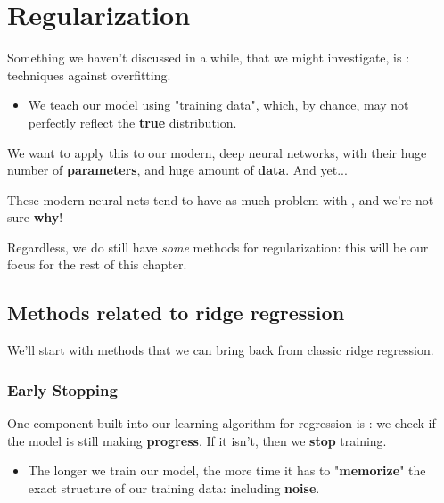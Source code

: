     \pagebreak
    
    
        
            




\pagebreak

\section{Regularization}

    Something we haven't discussed in a while, that we might investigate, is : techniques against overfitting.

    \begin{itemize}
        \item We teach our model using "training data", which, by chance, may not perfectly reflect the \textbf{true} distribution.
    \end{itemize}

    We want to apply this to our modern, deep neural networks, with their huge number of \textbf{parameters}, and huge amount of \textbf{data}. And yet...
    
    These modern neural nets  tend to have as much problem with , and we're not sure \textbf{why}!

    Regardless, we do still have \textit{some} methods for regularization: this will be our focus for the rest of this chapter.

    \subsection{Methods related to ridge regression}

        We'll start with methods that we can bring back from classic ridge regression.

        \subsubsection{Early Stopping}

            One component built into our learning algorithm for regression is : we check if the model is still making \textbf{progress}. If it isn't, then we \textbf{stop} training.

            \begin{itemize}
                \item The longer we train our model, the more time it has to "\textbf{memorize}" the exact structure of our training data: including \textbf{noise}.
            \end{itemize}

